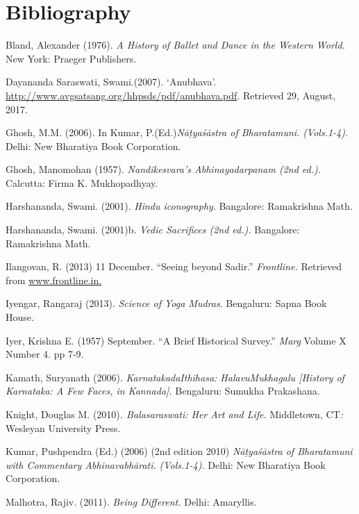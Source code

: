 \section*{Bibliography}

\begin{thebibliography}{99}
 Bland, Alexander (1976). \textit{A History of Ballet and Dance in the Western World.} New York: Praeger Publishers.

  Dayananda Saraswati, Swami.(2007). ‘Anubhava’. \url{http://www.avgsatsang.org/hhpsds/pdf/anubhava.pdf}. Retrieved 29, August, 2017.

  Ghosh, M.M. (2006). In Kumar, P.(Ed.)\textit{Nāṭyaśāstra of Bharatamuni.} \textit{(Vols.1-4).} Delhi: New Bharatiya Book Corporation.

  Ghosh, Manomohan (1957). \textit{Nandikesvara’s Abhinayadarpanam (2nd ed.).} Calcutta: Firma K. Mukhopadhyay.

  Harshananda, Swami. (2001). \textit{Hindu iconography}. Bangalore: Ramakrishna Math.

  Harshananda, Swami. (2001)b.\textit{ Vedic Sacrifices (2nd ed.).} Bangalore: Ramakrishna Math.

  Ilangovan, R. (2013) 11 December. “Seeing beyond Sadir.” \textit{Frontline.} Retrieved from \url{www.frontline.in.}

  Iyengar, Rangaraj (2013). \textit{Science of Yoga Mudras}. Bengaluru: Sapna Book House.

  Iyer, Krishna E. (1957) September. “A Brief Historical Survey.”\textit{ Marg} Volume X Number 4. pp 7-9.

  Kamath, Suryanath (2006). \textit{KarnatakadaIthihasa: HalavuMukhagalu [History of Karnataka: A Few Faces, in Kannada]. }Bengaluru: Sumukha Prakashana.

  Knight, Douglas M. (2010)\textit{. Balasaraswati: Her Art and Life. }Middletown, CT\textit{: }Wesleyan University Press.

  Kumar, Pushpendra (Ed.) (2006) (2nd edition 2010) \textit{Nāṭyaśāstra of Bharatamuni with Commentary Abhinavabhāratī.} \textit{(Vols.1-4).} Delhi: New Bharatiya Book Corporation.

  Malhotra, Rajiv. (2011). \textit{Being Different.} Delhi: Amaryllis.


\end{thebibliography}
